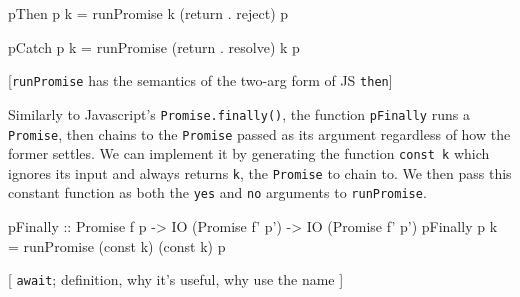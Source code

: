 \documentclass[12pt, english, letterpaper]{kuthesis}
\newcommand{\lit}[1]{\texttt{#1}}
\begin{document}
\begin{code}
pThen p k = runPromise k (return . reject) p

pCatch p k = runPromise (return . resolve) k p  
\end{code}
[\lit{runPromise} has the semantics of the two-arg form of JS \lit{then}]

Similarly to Javascript's \lit{Promise.finally()}, the function \lit{pFinally} runs a \lit{Promise}, then chains to the \lit{Promise} passed as its argument regardless of how the former settles.  We can implement it by generating the function \lit{const k} which ignores its input and always returns \lit{k}, the \lit{Promise} to chain to.  We then pass this constant function as both the \lit{yes} and \lit{no} arguments to \lit{runPromise}.

\begin{code}
pFinally :: Promise f p
         -> IO (Promise f' p')
         -> IO (Promise f' p')
pFinally p k = runPromise (const k) (const k) p
\end{code}

[ \lit{await}; definition, why it's useful, why use the name ]
\end{document}
